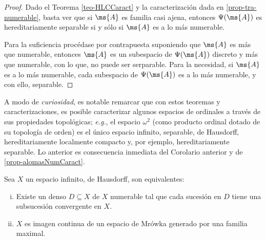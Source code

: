 	\begin{proof} 
		Dado el Teorema \ref{teo-HLCCaract} y la caracterización dada en \ref{prop-tra-numerable}, basta ver que si $\ms{A}$ es familia casi ajena, entonces $\Psi(\ms{A})$ es hereditariamente separable si y sólo si $\ms{A}$ es a lo más numerable.
	
		Para la suficiencia procédase por contrapuesta suponiendo que $\ms{A}$ es más que numerable, entonces $\ms{A}$ es un subespacio de $\Psi(\ms{A})$ discreto y más que numerable, con lo que, no puede ser serparable. Para la necesidad, si $\ms{A}$ es a lo más numerable, cada subespacio de $\Psi(\ms{A})$ es a lo más numerable, y con ello, separable.
	\end{proof}
	
	A modo de \textit{curiosidad}, es notable remarcar que con estos teoremas y caracterizaciones, es posible caracterizar algunos espacios de ordinales a través de sus propiedades topológicas; \textit{e.g.}, el espacio $\omega^2$ (como producto ordinal dotado de su topología de orden) es el único espacio infinito, separable, de Hausdorff, hereditariamente localmente compacto y, por ejemplo, hereditariamente separable. Lo anterior es consecuencia inmediata del Corolario anterior y de \ref{prop-alomasNumCaract}.
	
	\begin{corolario}
		Sea $X$ un espacio infinito, de Hausdorff, son equivalentes:
		\begin{enumerate}[i)]
			\item Existe un denso $D \subseteq X$ de $X$ numerable tal que cada sucesión en $D$ tiene una subsucesión convergente en $X$.
			\item $X$ es imagen continua de un espacio de Mrówka generado por una familia maximal.
		\end{enumerate}	
	\end{corolario}
	

